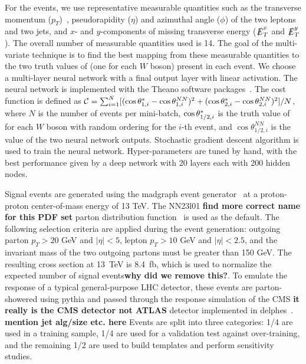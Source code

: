 For the \ssWW events, we use representative measurable quantities such
as the transverse momentum ($p_T$)~\cite{coordinate}, pseudorapidity ($\eta$) and
azimuthal angle ($\phi$) of the two leptons and two jets, and $x$- and $y$-components 
of missing transverse energy ($\slashed{E}_T^x$ and
$\slashed{E}_T^y$).  The overall number of measurable quantities used is 14. 
The goal of the multi-variate technique is to find
the best mapping from these measurable quantities to the two truth
values of \cts (one for each $W$ boson) present in each event.  We
choose a multi-layer neural network with a final output layer with
linear activation. The neural network is implemented with the Theano
software packages~\cite{theano1,theano2}. The cost function is defined as 
${\cal{C}}= \sum_{i=1}^{N} [(\ctsnb_{1,i} -\cos \theta^{NN}_{1,i})^2+(\ctsnb_{2,i}-\cos \theta^{NN}_{2,i})^2]/N$, 
where $N$ is the number of events per mini-batch,
$ \cos  \theta^{*}  _{1/2,i}$ is the truth value of \cts for each $W$ boson with
random ordering for the $i$-th event, and $\cos \theta^{NN}_{1/2, i}$ is the value of
the two neural network outputs. Stochastic gradient descent
algorithm is used to train the neural network. Hyper-parameters are tuned by hand,
with the best performance given by a deep network with 20 layers each with 200 hidden nodes.  

Signal \ssWW events are generated using the {\sc madgraph} event generator~\cite{madgraph} at a proton-proton center-of-mass energy of 13 TeV.  
The NN23l01 {\bf find more correct name for this PDF set} parton distribution function~\cite{pdf} is used as the default. 
The following selection criteria are applied during the event generation: outgoing parton $p_T > 20$ GeV and $|\eta| < 5$, 
lepton $p_T > 10$ GeV and $|\eta| < 2.5$, and the invariant mass of the two outgoing partons must be greater than 150 GeV. The resulting cross section at 13~TeV is 8.4~fb, which is used to normalize the expected number of signal events{\bf why did we remove this?}.
To emulate the response of a typical general-purpose LHC detector, these events are parton-showered using {\sc pythia}\cite{pythia} and passed through the 
response simulation of the CMS {\bf it really is the CMS detector not ATLAS} detector implemented in {\sc delphes}~\cite{delphes}. {\bf mention jet alg/size etc. here} Events
are split into three categories: 1/4 are used in a training sample,
1/4 are used for a validation test against over-training, and the
remaining 1/2 are used to build templates and perform sensitivity
studies.%

